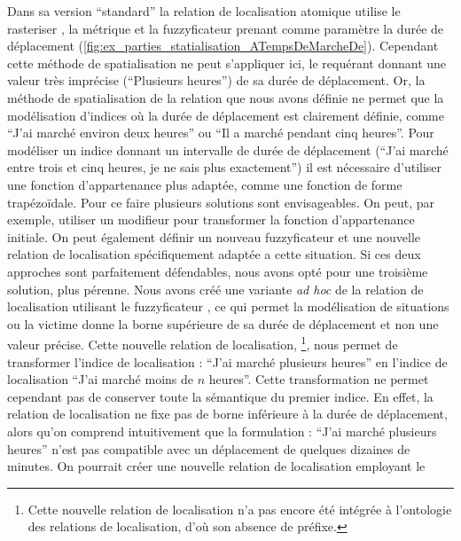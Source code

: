 Dans sa version \enquote{standard} la relation de localisation
atomique  utilise le rasteriser
, la métrique \onto[orla]{} et la fuzzyficateur
 prenant comme paramètre la durée de déplacement
(\autoref{fig:ex_parties_statialisation_ATempsDeMarcheDe}). Cependant
cette méthode de spatialisation ne peut s'appliquer ici, le requérant
donnant une valeur très imprécise (\ie \enquote{Plusieurs heures}) de
sa durée de déplacement. Or, la méthode de spatialisation de la
relation  que nous avons définie
ne permet que la modélisation d'indices où la durée de déplacement est
clairement définie, comme \enquote{J'ai marché environ deux heures} ou
\enquote{Il a marché pendant cinq heures}. Pour modéliser un indice
donnant un intervalle de durée de déplacement (\eg \enquote{J'ai
  marché entre trois et cinq heures, je ne sais plus exactement}) il
est nécessaire d'utiliser une fonction d'appartenance plus adaptée,
comme une fonction de forme trapézoïdale. Pour ce faire plusieurs
solutions sont envisageables. On peut, par exemple, utiliser un
modifieur pour transformer la fonction d'appartenance initiale. On
peut également définir un nouveau fuzzyficateur et une nouvelle
relation de localisation spécifiquement adaptée a cette situation. Si
ces deux approches sont parfaitement défendables, nous avons opté pour
une troisième solution, plus pérenne.
%
Nous avons créé une variante \emph{ad hoc} de la relation de
localisation  utilisant le
fuzzyficateur , ce qui permet la modélisation de
situations ou la victime donne la borne supérieure de sa durée de
déplacement et non une valeur précise. Cette nouvelle relation de
localisation,  \footnote{Cette
  nouvelle relation de localisation n'a pas encore été intégrée à
  l'ontologie des relations de localisation, d'où son absence de
  préfixe.}, nous permet de transformer l'indice de localisation :
\enquote{J'ai marché plusieurs heures} en l'indice de localisation
\enquote{J'ai marché moins de \(n\) heures}. Cette transformation ne
permet cependant pas de conserver toute la sémantique du premier
indice. En effet, la relation de localisation
 ne fixe pas de borne inférieure
à la durée de déplacement, alors qu'on comprend intuitivement que la
formulation : \enquote{J'ai marché plusieurs heures} n'est pas
compatible avec un déplacement de quelques dizaines de minutes. On
pourrait créer une nouvelle relation de localisation employant le
